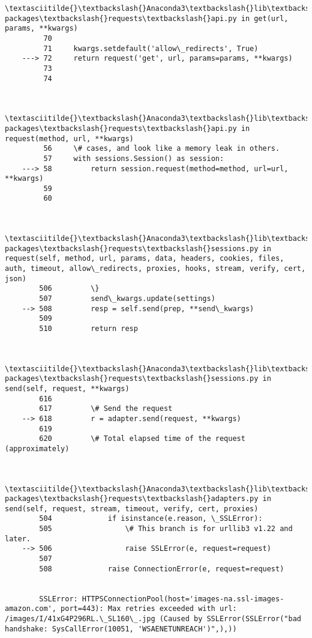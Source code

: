 \documentclass[11pt]{article}
\begin{document}
\begin{Verbatim}[commandchars=\\\{\}]
        \textasciitilde{}\textbackslash{}Anaconda3\textbackslash{}lib\textbackslash{}site-packages\textbackslash{}requests\textbackslash{}api.py in get(url, params, **kwargs)
         70 
         71     kwargs.setdefault('allow\_redirects', True)
    ---> 72     return request('get', url, params=params, **kwargs)
         73 
         74 
    

        \textasciitilde{}\textbackslash{}Anaconda3\textbackslash{}lib\textbackslash{}site-packages\textbackslash{}requests\textbackslash{}api.py in request(method, url, **kwargs)
         56     \# cases, and look like a memory leak in others.
         57     with sessions.Session() as session:
    ---> 58         return session.request(method=method, url=url, **kwargs)
         59 
         60 
    

        \textasciitilde{}\textbackslash{}Anaconda3\textbackslash{}lib\textbackslash{}site-packages\textbackslash{}requests\textbackslash{}sessions.py in request(self, method, url, params, data, headers, cookies, files, auth, timeout, allow\_redirects, proxies, hooks, stream, verify, cert, json)
        506         \}
        507         send\_kwargs.update(settings)
    --> 508         resp = self.send(prep, **send\_kwargs)
        509 
        510         return resp
    

        \textasciitilde{}\textbackslash{}Anaconda3\textbackslash{}lib\textbackslash{}site-packages\textbackslash{}requests\textbackslash{}sessions.py in send(self, request, **kwargs)
        616 
        617         \# Send the request
    --> 618         r = adapter.send(request, **kwargs)
        619 
        620         \# Total elapsed time of the request (approximately)
    

        \textasciitilde{}\textbackslash{}Anaconda3\textbackslash{}lib\textbackslash{}site-packages\textbackslash{}requests\textbackslash{}adapters.py in send(self, request, stream, timeout, verify, cert, proxies)
        504             if isinstance(e.reason, \_SSLError):
        505                 \# This branch is for urllib3 v1.22 and later.
    --> 506                 raise SSLError(e, request=request)
        507 
        508             raise ConnectionError(e, request=request)
    

        SSLError: HTTPSConnectionPool(host='images-na.ssl-images-amazon.com', port=443): Max retries exceeded with url: /images/I/41xG4P296RL.\_SL160\_.jpg (Caused by SSLError(SSLError("bad handshake: SysCallError(10051, 'WSAENETUNREACH')",),))

    \end{Verbatim}
\end{document}
